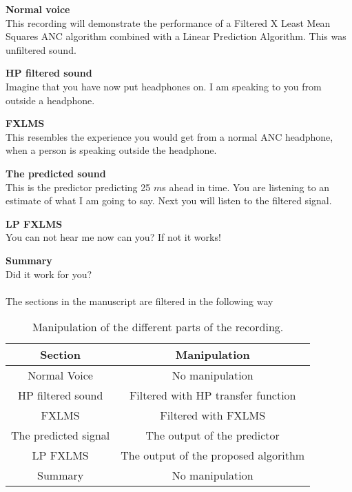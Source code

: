 \textbf{Normal voice}\\
This recording will demonstrate the performance of a Filtered X Least Mean Squares ANC algorithm combined with a Linear Prediction Algorithm. This was unfiltered sound. 

\textbf{HP filtered sound}\\
Imagine that you have now put headphones on. I am speaking to you from outside a headphone.

\textbf{FXLMS}\\
This resembles the experience you would get from a normal ANC headphone, when a person is speaking outside the headphone. 

\textbf{The predicted sound}\\
This is the predictor predicting 25 $m$s ahead in time. You are listening to an estimate of what I am going to say. Next you will listen to the filtered signal. 

\textbf{LP FXLMS}\\
You can not hear me now can you? If not it works!

\textbf{Summary}\\
Did it work for you? \\\\
The sections in the manuscript are filtered in the following way
\begin{table}[H]
	\centering
	\begin{tabular}{ c c } \toprule
		{Section}				& {Manipulation} \\ \bottomrule 
		Normal Voice			& No manipulation  	\\
		HP filtered sound		& Filtered with HP transfer function \\
		FXLMS					& Filtered with FXLMS	\\
		The predicted signal 	& The output of the predictor	\\
		LP FXLMS 				& The output of the proposed algorithm	\\
		Summary 				& No manipulation	\\
		\bottomrule
	\end{tabular}
	\caption{Manipulation of the different parts of the recording.}
	\label{tab:VoiceRecSections}
\end{table}













